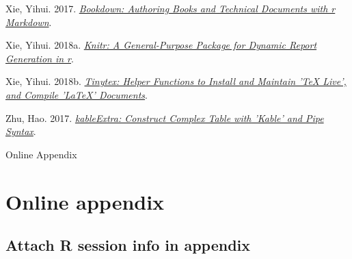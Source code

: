 \documentclass[
  12pt,
]{article}
\newlength{\cslhangindent}
\newlength{\cslentryspacingunit} %
\newenvironment{CSLReferences}[2] %
 {%
  \setlength{\parindent}{0pt}
  \ifodd #1
  \let\oldpar\par
  \def\par{\hangindent=\cslhangindent\oldpar}
  \fi
  \setlength{\parskip}{#2\cslentryspacingunit}
 }%
 {}
\begin{document}
\begin{CSLReferences}{1}{0}
\leavevmode{}%
Xie, Yihui. 2017. \emph{\href{https://github.com/rstudio/bookdown}{Bookdown: Authoring Books and Technical Documents with r Markdown}}.

\leavevmode{}%
Xie, Yihui. 2018a. \emph{\href{https://yihui.name/knitr/}{Knitr: A General-Purpose Package for Dynamic Report Generation in r}}.

\leavevmode{}%
Xie, Yihui. 2018b. \emph{\href{https://CRAN.R-project.org/package=tinytex}{Tinytex: Helper Functions to Install and Maintain 'TeX Live', and Compile 'LaTeX' Documents}}.

\leavevmode{}%
Zhu, Hao. 2017. \emph{\href{https://CRAN.R-project.org/package=kableExtra}{kableExtra: Construct Complex Table with 'Kable' and Pipe Syntax}}.

\end{CSLReferences}

\clearpage

\appendix
{}

\renewcommand{\thesection}{A}

\setcounter{page}{1}

\setcounter{table}{0}
\renewcommand{\thetable}{A\arabic{table}}
\renewcommand{\figurename}{Table}

\setcounter{figure}{0}
\renewcommand\thefigure{A\arabic{figure}}
\renewcommand{\figurename}{Figure}

\clearpage
{}

\vspace*{7cm}

\begin{center}
\begin{huge}
Online Appendix
\end{huge}
\end{center}
\vspace{3cm}

\clearpage
{}

\hypertarget{online-appendix}{%
\section{Online appendix}\label{online-appendix}}

\hypertarget{sec:rsessioninfo}{%
\subsection{Attach R session info in appendix}\label{sec:rsessioninfo}}
\end{document}
